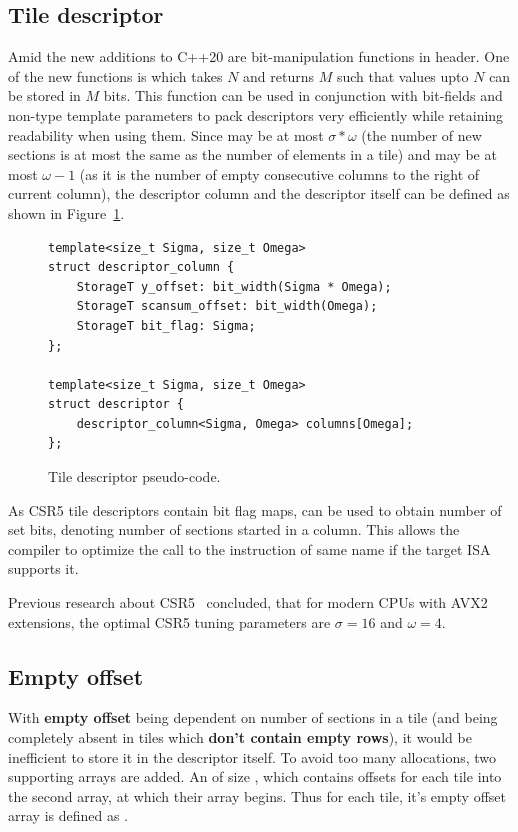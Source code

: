 \documentclass[thesis=M,english]{FITthesis}[2019/12/23]
\begin{document}
\subsection{Tile descriptor}

Amid the new additions to C++20 are bit-manipulation functions in  header.
One of the new functions is  which takes \(N\) and returns \(M\) such that values
upto \(N\) can be stored in \(M\) bits. This function can be used in conjunction with bit-fields
and non-type template parameters to pack descriptors very efficiently while retaining readability when using
them. Since  may be at most \(\sigma * \omega\) (the number of new sections is at most the same
as the number of elements in a tile) and  may be at most \(\omega - 1\) (as it is the number
of empty consecutive columns to the right of current column), the descriptor column and the descriptor
itself can be defined as shown in Figure~\ref{csr5:tileDesc}.

\begin{figure}[htp]

    \begin{verbatim}
template<size_t Sigma, size_t Omega>
struct descriptor_column {
    StorageT y_offset: bit_width(Sigma * Omega);
    StorageT scansum_offset: bit_width(Omega);
    StorageT bit_flag: Sigma;
};

template<size_t Sigma, size_t Omega>
struct descriptor {
    descriptor_column<Sigma, Omega> columns[Omega];
};
    \end{verbatim}
    \caption{Tile descriptor pseudo-code.}\label{csr5:tileDesc}
\end{figure}

As CSR5 tile descriptors contain bit flag maps,  can be used to obtain number of set bits,
denoting number of sections started in a column.
This allows the compiler to optimize the call to the instruction of same name if the target ISA supports it.

Previous research about CSR5~\cite{liu2015csr5} concluded, that for modern CPUs with AVX2 extensions, the optimal CSR5 tuning parameters
are \(\sigma = 16\) and \(\omega = 4\).


\subsection{Empty offset}

With \textbf{empty offset} being dependent on number of sections in a tile (and being completely absent
in tiles which \textbf{don't contain empty rows}), it would be inefficient to
store it in the descriptor itself. To avoid too many allocations, two supporting arrays are added.
An  of size , which contains offsets for each tile into the
second array,  at which their  array begins.
Thus for each tile, it's empty offset array is defined as
.
\end{document}
